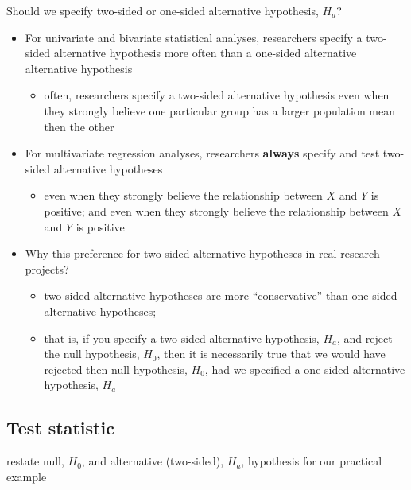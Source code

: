 \documentclass[
  letterpaper,
  DIV=11,
  numbers=noendperiod]{scrartcl}
\providecommand{\tightlist}{%
  \setlength{\itemsep}{0pt}\setlength{\parskip}{0pt}}\usepackage{longtable,booktabs,array}
\begin{document}
Should we specify two-sided or one-sided alternative hypothesis,
\(H_a\)?

\begin{itemize}
\tightlist
\item
  For univariate and bivariate statistical analyses, researchers specify
  a two-sided alternative hypothesis more often than a one-sided
  alternative alternative hypothesis

  \begin{itemize}
  \tightlist
  \item
    often, researchers specify a two-sided alternative hypothesis even
    when they strongly believe one particular group has a larger
    population mean then the other
  \end{itemize}
\item
  For multivariate regression analyses, researchers \textbf{always}
  specify and test two-sided alternative hypotheses

  \begin{itemize}
  \tightlist
  \item
    even when they strongly believe the relationship between \(X\) and
    \(Y\) is positive; and even when they strongly believe the
    relationship between \(X\) and \(Y\) is positive
  \end{itemize}
\item
  Why this preference for two-sided alternative hypotheses in real
  research projects?

  \begin{itemize}
  \tightlist
  \item
    two-sided alternative hypotheses are more ``conservative'' than
    one-sided alternative hypotheses;
  \item
    that is, if you specify a two-sided alternative hypothesis, \(H_a\),
    and reject the null hypothesis, \(H_0\), then it is necessarily true
    that we would have rejected then null hypothesis, \(H_0\), had we
    specified a one-sided alternative hypothesis, \(H_a\)
  \end{itemize}
\end{itemize}

\subsection{Test statistic}\label{test-statistic}

restate null, \(H_0\), and alternative (two-sided), \(H_a\), hypothesis
for our practical example
\end{document}
